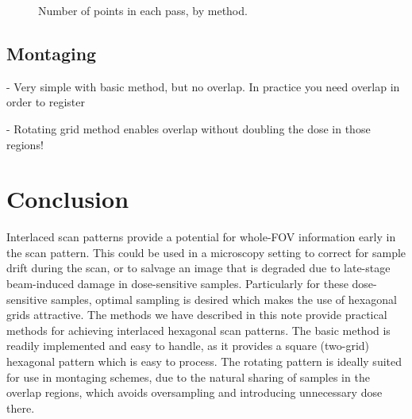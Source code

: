 \documentclass{article}
\begin{document}
\begin{figure}[ht]
\caption{\label{fig:passsizes} Number of points in each pass, by method.}
\end{figure}

\subsection{Montaging}
\label{sec:montaging}

- Very simple with basic method, but no overlap. In practice you need overlap in order to register

- Rotating grid method enables overlap without doubling the dose in those regions!

\section{Conclusion}
\label{sec:conclusion}

Interlaced scan patterns provide a potential for whole-FOV information early in the scan pattern.
%
This could be used in a microscopy setting to correct for sample drift during the scan, or to salvage an image that is degraded due to late-stage beam-induced damage in dose-sensitive samples.
%
Particularly for these dose-sensitive samples, optimal sampling is desired which makes the use of hexagonal grids attractive.
%
The methods we have described in this note provide practical methods for achieving interlaced hexagonal scan patterns.
%
The basic method is readily implemented and easy to handle, as it provides a square (two-grid) hexagonal pattern which is easy to process.
%
The rotating pattern is ideally suited for use in montaging schemes, due to the natural sharing of samples in the overlap regions, which avoids oversampling and introducing unnecessary dose there.



\end{document}
